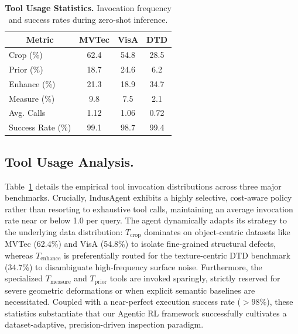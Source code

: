 \documentclass{llmxive}
\begin{document}
{\begin{table}[t]
\vspace{-1.5em}
  \centering
  \setlength{\tabcolsep}{4.5pt}
  \footnotesize
  \begin{tabular}{lccc}
    \toprule
    \multicolumn{1}{c}{\textbf{Metric}} & \textbf{MVTec} & \textbf{VisA} & \textbf{DTD} \\
    \midrule
    Crop (\%) & 62.4 & 54.8 & 28.5 \\
    Prior (\%) & 18.7 & 24.6 & 6.2 \\
    Enhance (\%) & 21.3 & 18.9 & 34.7 \\
    Measure (\%) & 9.8 & 7.5 & 2.1 \\
    \midrule
    Avg. Calls & 1.12 & 1.06 & 0.72 \\
    Success Rate (\%) & 99.1 & 98.7 & 99.4 \\
    \bottomrule
  \end{tabular}
  \vspace{-1.0em}

\caption{\textbf{Tool Usage Statistics.} Invocation frequency and success rates during zero-shot inference.}
\label{tab:tool_usage}
\end{table}

\subsection{Tool Usage Analysis.} Table~\ref{tab:tool_usage} details the empirical tool invocation distributions across three major benchmarks. Crucially, IndusAgent exhibits a highly selective, cost-aware policy rather than resorting to exhaustive tool calls, maintaining an average invocation rate near or below 1.0 per query. The agent dynamically adapts its strategy to the underlying data distribution: $T_{\text{crop}}$ dominates on object-centric datasets like MVTec (62.4\%) and VisA (54.8\%) to isolate fine-grained structural defects, whereas $T_{\text{enhance}}$ is preferentially routed for the texture-centric DTD benchmark (34.7\%) to disambiguate high-frequency surface noise. Furthermore, the specialized $T_{\text{measure}}$ and $T_{\text{prior}}$ tools are invoked sparingly, strictly reserved for severe geometric deformations or when explicit semantic baselines are necessitated. Coupled with a near-perfect execution success rate ($>98\%$), these statistics substantiate that our Agentic RL framework successfully cultivates a dataset-adaptive, precision-driven inspection paradigm.






}
\end{document}
